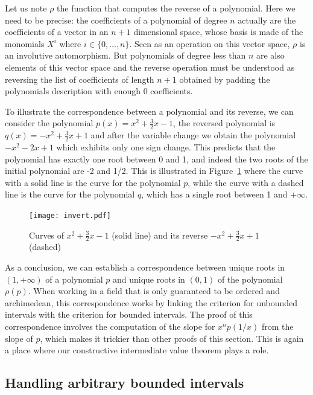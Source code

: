 \documentclass{mscs}
\begin{document}
Let us note \(\rho\) the function that computes the reverse of a
polynomial.  Here we need to be precise: the coefficients of a
polynomial of degree \(n\) actually are the coefficients of a vector
in an \(n+1\) dimensional space, whose basis is made of the monomials
\(X^i\) where \(i\in\{0,\dots, n\}\).  Seen as an operation on this vector
space, \(\rho\) is an involutive automorphism.  But
polynomials of degree less than \(n\) are also elements of this vector
space and the reverse operation must be understood as reversing the
list of coefficients of length \(n+1\) obtained by padding the
polynomials description with enough 0 coefficients.


To illustrate the correspondence between a polynomial and its reverse,
we can consider the polynomial \(p(x) = x^2 + \frac{3}{2} x - 1\),
the reversed polynomial is \(q(x) = -x^2 + \frac{3}{2}x + 1\) and after
the variable change we obtain the polynomial \(-x^2-2x+1\)
which exhibits only one sign change.  This predicts that the polynomial has
exactly one root between 0 and 1, and indeed the two roots of the initial
polynomial are -2 and 1/2.  This is illustrated in
Figure~\ref{invert} where the curve with a solid line is the curve for the
polynomial \(p\), while the curve with a dashed line is the curve for
the polynomial \(q\), which has a single root between 1 and \(+\infty\).
\begin{figure}
\begin{center}
\texttt{[image: invert.pdf]}
\end{center}
\caption{\label{invert} Curves of \(x^2+\frac{3}{2}x-1\) (solid line)
and its reverse \(-x^2 + \frac{3}{2} x + 1\) (dashed)}
\end{figure}

As a conclusion, we can establish a correspondence between unique
roots in \((1,+\infty)\) of a polynomial \(p\) and unique roots in
\((0,1)\) of the polynomial \(\rho(p)\).  When working in a field that
is only guaranteed to be ordered and archimedean, this
correspondence works by linking the criterion for unbounded intervals
with the criterion for bounded intervals.  The proof of this
correspondence
involves the
computation of the slope for \(x^np(1/x)\) from the slope of \(p\),
which makes it trickier than other proofs of this section.  This is again a place where
our constructive intermediate value theorem plays a role.

\subsection{Handling arbitrary bounded intervals}
\end{document}

